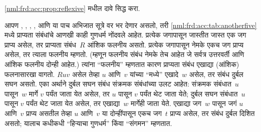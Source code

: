 \begin{prob}
  \ref{nml:frd:acc:prop:reflexive} मधील दावे सिद्ध करा.
\end{prob}

आपण , , , , आणि 
या पाच अभिजात सूत्रे वर भर देणार असलो, तरी
\ref{nml:frd:acc:tab:anotherfive} मध्ये प्राप्यता संबंधांचे आणखी
काही गुणधर्म नोंदवले आहेत. प्रत्येक जगापासून जास्तीत
जास्त एक जग प्राप्य असेल, तर प्राप्यता संबंध~$R$
आंशिक फलनीय असतो. प्रत्येक जगापासून नेमके
एकच जग प्राप्य असेल, तर त्याला फलनीय म्हणतो.
(म्हणून फलनीय संबंध नेमके तेच आहेत जे सर्वत्र उत्तरवर्ती
आणि आंशिक फलनीय दोन्ही आहेत.) त्यांना ``फलनीय''
म्हणतात कारण प्राप्यता संबंध एखाद्या (आंशिक) फलनासारखा
वागतो. $Ruv$ असेल तेव्हा $u$ आणि~$v$ यांच्या
``मध्ये'' एखादे~$w$ असेल, तर संबंध दुर्बल सघन
असतो. एका अर्थाने दुर्बल सघन संबंध संक्रमक संबंधांच्या
उलट आहेत: संक्रमक संबंधात~$u$ पासून~$w$ मार्गे
$v$ पर्यंत जाता येत असेल, तर $u$ पासून $v$ पर्यंत
थेट जाता येते; दुर्बल सघन संबंधात~$u$ पासून $v$
पर्यंत थेट जाता येत असेल, तर एखाद्या~$w$ मार्गेही
जाता येते. एखाद्या जग~$w$ पासून जगं $u$ आणि~$v$
प्राप्य असतील तेव्हा $u$ आणि~$v$ या दोन्हींपासून
एकच जग~$t$ प्राप्य असेल, तर संबंध दुर्बल दिशित असतो;
यालाच कधीकधी ``हिऱ्याचा गुणधर्म'' किंवा ``संगमन''
म्हणतात.

